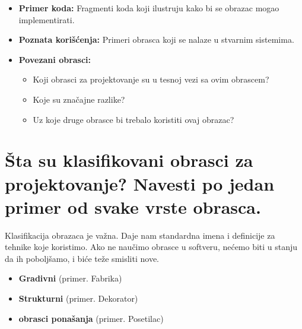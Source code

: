 \documentclass[a4paper]{article}
\begin{document}
\begin{itemize}
\begin{itemize}
          \end{itemize}
    \item \textbf{Primer koda:} Fragmenti koda koji ilustruju kako bi se obrazac mogao implementirati.
    \item \textbf{Poznata korišćenja:} Primeri obrasca koji se nalaze u stvarnim sistemima.
    \item \textbf{Povezani obrasci:} 
          \begin{itemize}
            \item Koji obrasci za projektovanje su u tesnoj vezi sa ovim obrascem?
            \item Koje su značajne razlike?
            \item Uz koje druge obrasce bi trebalo koristiti ovaj obrazac?
          \end{itemize}
  \end{itemize}

\section{Šta su klasifikovani obrasci za projektovanje? Navesti po jedan primer od svake vrste obrasca.}
  Klasifikacija obrazaca je važna. Daje nam standardna imena i definicije za tehnike koje koristimo. 
  Ako ne naučimo obrasce u softveru, nećemo biti u stanju da ih poboljšamo, i biće teže smisliti nove.
  \begin{itemize}
    \item \textbf{Gradivni} (primer. Fabrika)
    \item \textbf{Strukturni} (primer. Dekorator)
    \item \textbf{obrasci ponašanja} (primer. Posetilac)
  \end{itemize}
\end{document}

